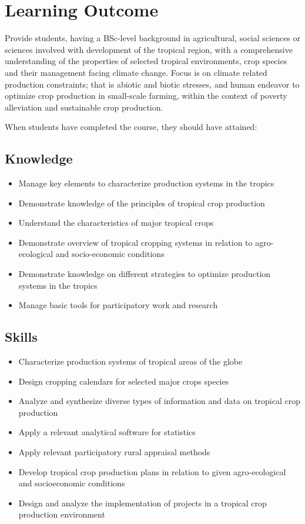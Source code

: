 \section*{Learning Outcome}
Provide students, having a BSc-level background in agricultural, social sciences or sciences involved with development of the tropical region, with a comprehensive understanding of the properties of selected tropical environments, crop species and their management facing climate change. Focus is on climate related production constraints; that is abiotic and biotic stresses, and human endeavor to optimize crop production in small-scale farming, within the context of poverty alleviation and sustainable crop production.

When students have completed the course, they should have attained:

\subsection*{Knowledge}

\begin{itemize}
    \item Manage key elements to characterize production systems in the tropics
    \item Demonstrate knowledge of the principles of tropical crop production
    \item Understand the characteristics of major tropical crops
    \item Demonstrate overview of tropical cropping systems in relation to agro-ecological and socio-economic conditions
    \item Demonstrate knowledge on different strategies to optimize production systems in the tropics
    \item Manage basic tools for participatory work and research
\end{itemize}

\subsection*{Skills}

\begin{itemize}
    \item Characterize production systems of tropical areas of the globe
    \item Design cropping calendars for selected major crops species
    \item Analyze and synthesize diverse types of information and data on tropical crop production
    \item Apply a relevant analytical software for statistics
    \item Apply relevant participatory rural appraisal methods
    \item Develop tropical crop production plans in relation to given agro-ecological and socioeconomic conditions
    \item Design and analyze the implementation of projects in a tropical crop production environment
\end{itemize}

